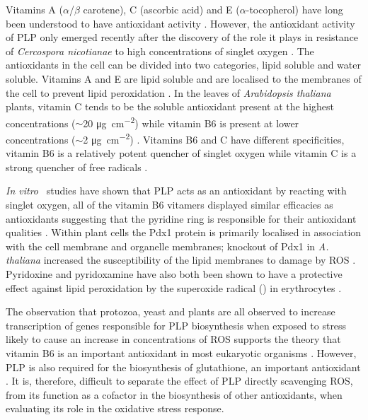Vitamins A ($\alpha$/$\beta$ carotene), C (ascorbic acid) and E ($\alpha$-tocopherol) have long been understood to have antioxidant activity \cite{Miller1996,Diplock1997,Burton1982,Traber2011}. However, the antioxidant activity of PLP only emerged recently after the discovery of the role it plays in resistance of \textit{Cercospora nicotianae} to high concentrations of singlet oxygen \cite{Ehrenshaft1998}. The antioxidants in the cell can be divided into two categories, lipid soluble and water soluble. Vitamins A and E are lipid soluble and are localised to the membranes of the cell to prevent lipid peroxidation \cite{Asensi2010}. In the leaves of \textit{Arabidopsis thaliana} plants, vitamin C tends to be the soluble antioxidant present at the highest concentrations ($\sim$20 \si{\micro\gram\per\centi\metre\squared}) while vitamin B6 is present at lower concentrations ($\sim$2 \si{\micro\gram\per\centi\metre\squared}) \cite{Triantaphylides2009}. Vitamins B6 and C have different specificities, vitamin B6 is a relatively potent quencher of singlet oxygen while vitamin C is a strong quencher of free radicals \cite{Ehrenshaft1999a,Triantaphylides2009,Asensi2010}.                           

\textit{In vitro}~ studies have shown that PLP acts as an antioxidant by reacting with singlet oxygen, all of the vitamin B6 vitamers displayed similar efficacies as antioxidants suggesting that the pyridine ring is responsible for their antioxidant qualities \cite{Bilski2000}. Within plant cells the Pdx1 protein is primarily localised in association with the cell membrane and organelle membranes; knockout of Pdx1 in \textit{A. thaliana} increased the susceptibility of the lipid membranes to damage by ROS \cite{Chen2005}. Pyridoxine and pyridoxamine have also both been shown to have a protective effect against lipid peroxidation by the superoxide radical () in erythrocytes \cite{Jain2001}.

The observation that protozoa, yeast and plants are all observed to increase transcription of genes responsible for PLP biosynthesis when exposed to stress likely to cause an increase in concentrations of ROS supports the theory that vitamin B6 is an important antioxidant in most eukaryotic organisms \cite{Knockel2012,Chen2003,Denslow2005}. However, PLP is also required for the biosynthesis of glutathione, an important antioxidant \cite{Denslow2005}. It is, therefore, difficult to separate the effect of PLP directly scavenging ROS, from its function as a cofactor in the biosynthesis of other antioxidants, when evaluating its role in the oxidative stress response.  
\newpage

